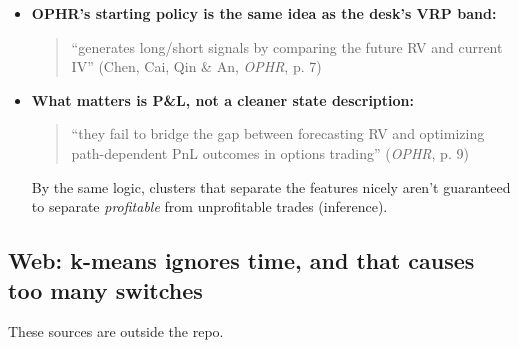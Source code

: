 \documentclass{article}
\begin{document}
\begin{itemize}

\item \textbf{OPHR's starting policy is the same idea as the desk's VRP band:}

\begin{quote}``generates long/\allowbreak{}short signals by comparing the future RV and current IV'' (Chen, Cai, Qin \& An, \emph{OPHR}, p. 7)\end{quote}

\item \textbf{What matters is P\&L, not a cleaner state description:}

\begin{quote}``they fail to bridge the gap between forecasting RV and optimizing path-dependent PnL outcomes in options trading'' (\emph{OPHR}, p. 9)\end{quote}

By the same logic, clusters that separate the features nicely aren't guaranteed to separate \emph{profitable} from unprofitable trades (inference).

\end{itemize}

\subsection{Web: k-means ignores time, and that causes too many switches}

These sources are outside the repo.
\end{document}
